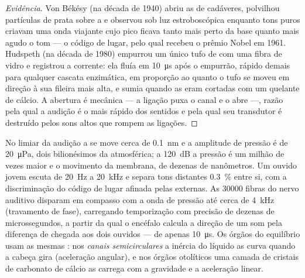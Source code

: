 \begin{proof}[Evidência]
Von Békésy (na década de 1940) abriu as  de cadáveres,
polvilhou partículas de prata sobre a  e observou sob
luz estroboscópica enquanto tons puros criavam uma onda viajante cujo
pico ficava tanto mais perto da base quanto mais agudo o tom --- o
código de lugar, pelo qual recebeu o prêmio Nobel em 1961. Hudspeth (na
década de 1980) empurrou um único tufo de  com uma fibra de vidro
e registrou a corrente: ela fluía em \qty{10}{\micro s} após o empurrão,
rápido demais para qualquer cascata enzimática, em proporção ao quanto
o tufo se moveu em direção à sua fileira mais alta, e sumia quando as
 eram cortadas com um quelante de cálcio. A abertura é
mecânica --- a ligação puxa o canal e o abre ---, razão pela qual a
audição é o mais rápido dos sentidos e pela qual seu transdutor é
destruído pelos sons altos que rompem as ligações.
\end{proof}

\begin{example}\label{ex:b3:sensory-systems:ear-numbers}
No limiar da audição a  se move cerca de \qty{0.1}{nm} e
a amplitude de pressão é de \qty{20}{\micro Pa}, dois bilionésimos da
atmosférica; a \qty{120}{dB} a pressão é um milhão de vezes maior e o
movimento da membrana, de dezenas de nanômetros. Um ouvido jovem escuta
de \qty{20}{Hz} a \qty{20}{kHz} e separa tons distantes \qty{0.3}{\%}
entre si, com a discriminação do código de lugar afinada pelas  externas. As \num{30000} fibras do nervo auditivo disparam em
compasso com a onda de pressão até cerca de \qty{4}{kHz} (travamento de
fase), carregando temporização com precisão de dezenas de
microssegundos, a partir da qual o encéfalo calcula a direção de um som
pela diferença de chegada aos dois ouvidos --- de apenas
\qty{10}{\micro s}. Os órgãos do equilíbrio usam as mesmas : nos \emph{canais semicirculares} a inércia do líquido as curva
quando a cabeça gira (aceleração angular), e nos órgãos otolíticos uma
camada de cristais de carbonato de cálcio as carrega com a gravidade e a
aceleração linear.
\end{example}

